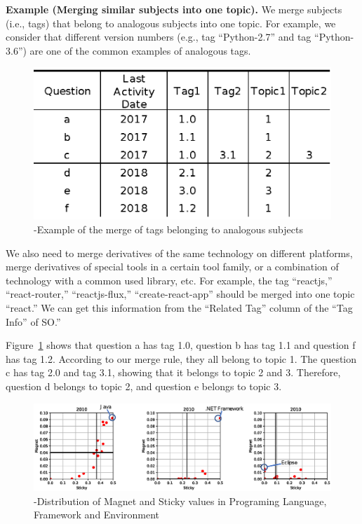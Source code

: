 \documentclass[english,preprint,JIP,technote]{ipsj}
\begin{document}
\noindent
\textbf{Example (Merging similar subjects into one topic).}
We merge subjects (i.e., tags) that belong to analogous subjects into one topic. For example, we consider that different version numbers (e.g., tag ``Python-2.7'' and tag ``Python-3.6'') are one of the common examples of analogous tags. 

\begin{figure}[t]
 \centering
 \includegraphics[width=0.80\hsize]{img/example001.eps}  
 \caption{-Example of the merge of tags belonging to analogous subjects} 
 \label{fig:example1} 
\end{figure}


We also need to merge derivatives of the same technology on different platforms, merge derivatives of special tools in a certain tool family, or a combination of technology with a common used library, etc. For example, the tag ``reactjs,'' ``react-router,'' ``reactjs-flux,'' ``create-react-app'' should be merged into one topic ``react.''
We can get this information from the ``Related Tag'' column of the ``Tag Info'' of SO.''

Figure~\ref{fig:example1} shows that question a has tag 1.0, question b has tag 1.1 and question f has tag 1.2. According to our merge rule, they all belong to topic 1. The question c has tag 2.0 and tag 3.1, showing that it belongs to topic 2 and 3. Therefore, question d belongs to topic 2, and question e belongs to topic 3.


\begin{figure}[t]
 \centering
 \includegraphics[width=1.0\hsize]{img/2010all.eps}  
 \caption{-Distribution of Magnet and Sticky values in Programing Language, Framework and Environment} 
 \label{fig:2010} 
\end{figure}
\end{document}
